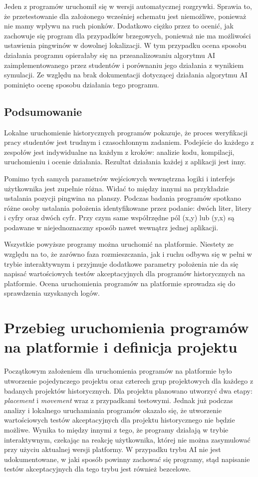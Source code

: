 Jeden z programów uruchomił się w wersji automatycznej rozgrywki.
Sprawia to, że przetestowanie dla założonego wcześniej schematu jest niemożliwe, ponieważ nie mamy wpływu na ruch pionków.
Dodatkowo ciężko przez to ocenić, jak zachowuje się program dla przypadków brzegowych, ponieważ nie ma możliwości ustawienia pingwinów w dowolnej lokalizacji.
W tym przypadku ocena sposobu działania programu opierałaby się na przeanalizowaniu algorytmu AI zaimplementowanego przez studentów i porównaniu jego działania z wynikiem symulacji.
Ze względu na brak dokumentacji dotyczącej działania algorytmu AI pominięto ocenę sposobu działania tego programu.

\subsection{Podsumowanie}

Lokalne uruchomienie historycznych programów pokazuje, że proces weryfikacji pracy studentów jest trudnym i czasochłonnym zadaniem.
Podejście do każdego z zespołów jest indywidualne na każdym z kroków: analizie kodu, kompilacji, uruchomieniu i ocenie działania.
Rezultat działania każdej z aplikacji jest inny.

Pomimo tych samych parametrów wejściowych wewnętrzna logiki i interfejs użytkownika jest zupełnie różna.
Widać to między innymi na przykładzie ustalania pozycji pingwina na planszy.
Podczas badania programów spotkano różne osoby ustalania położenia identyfikowane przez podanie: dwóch liter, litery i cyfry oraz dwóch cyfr.
Przy czym same współrzędne pól (x,y) lub (y,x) są podawane w niejednoznaczny sposób nawet wewnątrz jednej aplikacji.

Wszystkie powyższe programy można uruchomić na platformie.
Niestety ze względu na to, że zarówno faza rozmieszczania, jak i ruchu odbywa się w pełni w trybie interaktywnym i przyjmuje dodatkowe parametry położenia nie da się napisać wartościowych testów akceptacyjnych dla programów historycznych na platformie.
Ocena uruchomienia programów na platformie sprowadza się do sprawdzenia uzyskanych logów.

\section{Przebieg uruchomienia programów na platformie i definicja projektu}

Początkowym założeniem dla uruchomienia programów na platformie było utworzenie pojedynczego projektu oraz czterech grup projektowych dla każdego z badanych projektów historycznych.
Dla projektu planowano utworzyć dwa etapy: \textit{placement} i \textit{movement} wraz z przypadkami testowymi.
Jednak już podczas analizy i lokalnego uruchamiania programów okazało się, że utworzenie wartościowych testów akceptacyjnych dla projektu historycznego nie będzie możliwe.
Wynika to między innymi z tego, że programy działają w trybie interaktywnym, czekając na reakcję użytkownika, której nie można zasymulować przy użyciu aktualnej wersji platformy.
W przypadku trybu AI nie jest udokumentowane, w jaki sposób powinny zachować się programy, stąd napisanie testów akceptacyjnych dla tego trybu jest również bezcelowe.

